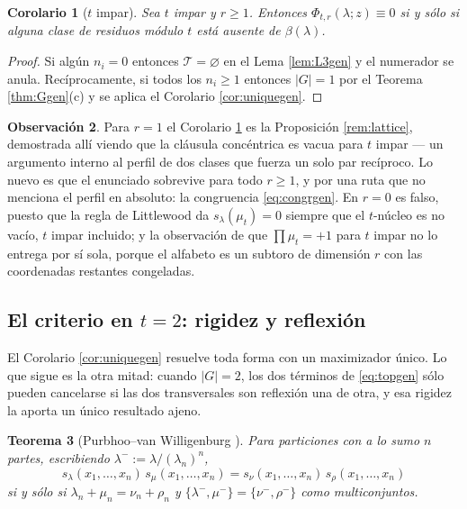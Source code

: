 \documentclass[11pt,reqno]{amsart}
\theoremstyle{plain}
\newtheorem{theorem}{Teorema}[section]
\newtheorem{corollary}[theorem]{Corolario}
\theoremstyle{definition}
\newtheorem{remark}[theorem]{Observación}
\newcommand{\zt}{\mu_t}
\begin{document}
\begin{corollary}[$t$ impar]\label{cor:oddgen}
Sea $t$ impar y $r\ge1$. Entonces $\Phi_{t,r}(\lambda;z)\equiv0$ si y sólo si alguna clase de residuos
módulo $t$ está ausente de $\beta(\lambda)$.
\end{corollary}

\begin{proof}
Si algún $n_i=0$ entonces $\mathcal T=\varnothing$ en el Lema \ref{lem:L3gen} y el numerador se anula.
Recíprocamente, si todos los $n_i\ge1$ entonces $|G|=1$ por el Teorema \ref{thm:Ggen}(c) y se aplica
el Corolario \ref{cor:uniquegen}.
\end{proof}

\begin{remark}
Para $r=1$ el Corolario \ref{cor:oddgen} es la Proposición \ref{rem:lattice}, demostrada allí viendo
que la cláusula concéntrica es vacua para $t$ impar --- un argumento interno al perfil de dos clases
que fuerza un solo par recíproco. Lo nuevo es que el enunciado sobrevive para todo $r\ge1$, y por una
ruta que no menciona el perfil en absoluto: la congruencia \eqref{eq:congrgen}. En $r=0$ es falso,
puesto que la regla de Littlewood da $s_\lambda(\zt)=0$ siempre que el $t$-núcleo es no vacío, $t$
impar incluido; y la observación de que $\prod\zt=+1$ para $t$ impar no lo entrega por sí sola,
porque el alfabeto es un subtoro de dimensión $r$ con las coordenadas restantes congeladas.
\end{remark}

\subsection{El criterio en \texorpdfstring{$t=2$}{t=2}: rigidez y reflexión}\label{sec:rigidity}

El Corolario \ref{cor:uniquegen} resuelve toda forma con un maximizador único. Lo que sigue es la
otra mitad: cuando $|G|=2$, los dos términos de \eqref{eq:topgen} sólo pueden cancelarse si las dos
transversales son reflexión una de otra, y esa rigidez la aporta un único resultado ajeno.

\begin{theorem}[Purbhoo--van Willigenburg {\cite[Thm.~2.5]{PvW}}]\label{thm:PvW}
Para particiones con a lo sumo $n$ partes, escribiendo $\lambda^{-}:=\lambda/(\lambda_n)^{n}$,
\[
  s_\lambda(x_1,\dots,x_n)\,s_\mu(x_1,\dots,x_n)=s_\nu(x_1,\dots,x_n)\,s_\rho(x_1,\dots,x_n)
\]
si y sólo si $\lambda_n+\mu_n=\nu_n+\rho_n$ y $\{\lambda^{-},\mu^{-}\}=\{\nu^{-},\rho^{-}\}$ como
multiconjuntos.
\end{theorem}
\end{document}
